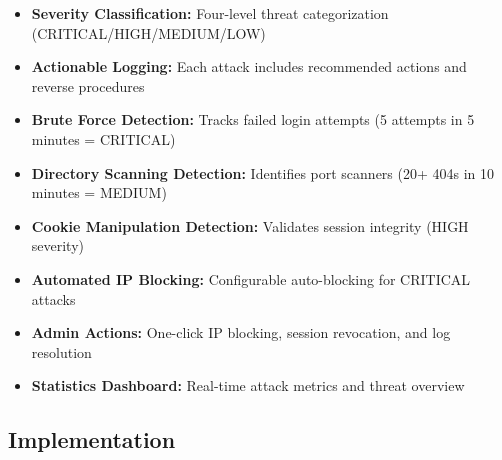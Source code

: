 \documentclass[12pt,a4paper]{article}
\begin{document}
\begin{itemize}[leftmargin=*]
    \item \textbf{Severity Classification:} Four-level threat categorization (CRITICAL/HIGH/MEDIUM/LOW)
    \item \textbf{Actionable Logging:} Each attack includes recommended actions and reverse procedures
    \item \textbf{Brute Force Detection:} Tracks failed login attempts (5 attempts in 5 minutes = CRITICAL)
    \item \textbf{Directory Scanning Detection:} Identifies port scanners (20+ 404s in 10 minutes = MEDIUM)
    \item \textbf{Cookie Manipulation Detection:} Validates session integrity (HIGH severity)
    \item \textbf{Automated IP Blocking:} Configurable auto-blocking for CRITICAL attacks
    \item \textbf{Admin Actions:} One-click IP blocking, session revocation, and log resolution
    \item \textbf{Statistics Dashboard:} Real-time attack metrics and threat overview
\end{itemize}

\subsection{Implementation}
\end{document}
